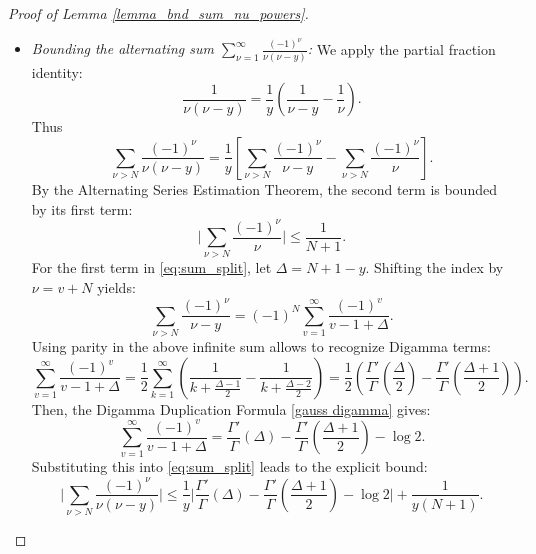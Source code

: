 \documentclass[11pt,letterpaper,oneside,reqno]{amsart}
\renewcommand{\^}[1]{\widehat{#1}}
\numberwithin{equation}{section}
\theoremstyle{remark}
\begin{document}
\begin{proof}[Proof of Lemma \ref{lemma_bnd_sum_nu_powers}]\ 
%
\begin{itemize}
%
\item {\it Bounding the alternating sum  $\sum_{\nu=1}^\infty \frac{(-1)^\nu}{\nu(\nu-y)}$:}
We apply the partial fraction identity:
\begin{equation}
\label{eq:partial_frac}
\frac{1}{\nu(\nu - y)} = \frac{1}{y} \left( \frac{1}{\nu - y} - \frac{1}{\nu} \right).
\end{equation}
Thus
\begin{equation}
\label{eq:sum_split}
\sum_{\nu > N} \frac{(-1)^\nu}{\nu(\nu - y)} = \frac{1}{y} \left[ \sum_{\nu > N} \frac{(-1)^\nu}{\nu - y} - \sum_{\nu > N} \frac{(-1)^\nu}{\nu} \right].
\end{equation}
By the Alternating Series Estimation Theorem, the second term is bounded by its first term:
\begin{equation}
\label{eq:harmonic_bound}
\bigg|  \sum_{\nu > N} \frac{(-1)^{\nu}}{\nu} \bigg|  \leq \frac{1}{N+1}.
\end{equation}
For the first term in \eqref{eq:sum_split}, let $\Delta = N+1-y$. Shifting the index by $\nu = v + N$ yields:
\begin{equation}
\label{eq:shifted_sum}
\sum_{\nu > N} \frac{(-1)^{\nu}}{\nu - y} = (-1)^N \sum_{v=1}^{\infty} \frac{(-1)^v}{v - 1 + \Delta}.
\end{equation}
Using parity in the above infinite sum allows to recognize Digamma terms: %
\begin{equation}
\sum_{v=1}^{\infty} \frac{(-1)^v}{v - 1 + \Delta} 
= \frac{1}{2} \sum_{k=1}^{\infty} \left( \frac{1}{k + \frac{\Delta-1}{2}} - \frac{1}{k + \frac{\Delta-2}{2}} \right) = \frac{1}{2} \left( \frac{\Gamma'}{\Gamma}\left( \frac{\Delta}{2} \right) - \frac{\Gamma'}{\Gamma}\left( \frac{\Delta+1}{2} \right) \right).
\end{equation}
Then, the Digamma Duplication Formula \eqref{gauss digamma} gives:
\begin{equation}
\sum_{v=1}^{\infty} \frac{(-1)^v}{v - 1 + \Delta}  
= \frac{\Gamma'}{\Gamma}(\Delta) - \frac{\Gamma'}{\Gamma}\left( \frac{\Delta+1}{2} \right) - \log 2.
\end{equation}
Substituting this into \eqref{eq:sum_split} leads to the explicit bound:
\begin{equation}
\bigg|  \sum_{\nu > N} \frac{(-1)^\nu}{\nu(\nu - y)} \bigg|  \leq \frac{1}{y} \bigg|  \frac{\Gamma'}{\Gamma}(\Delta) - \frac{\Gamma'}{\Gamma}\left( \frac{\Delta+1}{2} \right) - \log 2 \bigg|  + \frac{1}{y(N+1)}.
\end{equation}



\end{itemize}
\end{proof}
\end{document}
